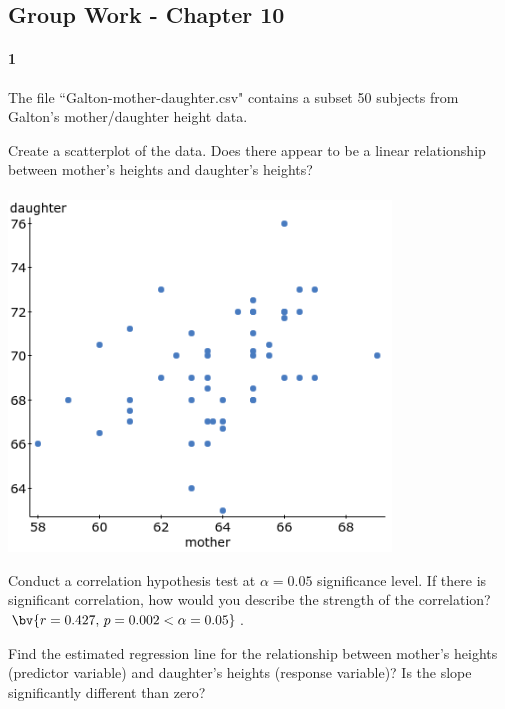 \documentclass{article}
\begin{document}
\begin{flushleft}
\section*{Group Work - Chapter 10}
\paragraph{1} The file ``Galton-mother-daughter.csv" contains a subset 50 subjects from Galton's mother/daughter height data.
\begin{enumalpha}
\item Create a scatterplot of the data. Does there appear to be a linear relationship between mother's heights and daughter's heights?\\
\medskip
{}\\
\medskip
\includegraphics[width=4in]{images/grp10_Q1_a}
\vspace{.5in}
\item Conduct a correlation hypothesis test at $\alpha = 0.05$ significance level. If there is significant correlation, how would you describe the strength of the correlation?\\
\medskip
$\bv{r = 0.427, \, p = 0.002 < \alpha = 0.05}$. 
\newpage
\item Find the estimated regression line for the relationship between mother's heights (predictor variable) and daughter's heights (response variable)? Is the slope significantly different than zero?\\

\end{enumalpha}
\end{flushleft}
\end{document}
